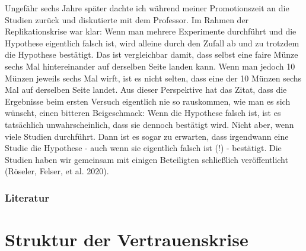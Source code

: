 \documentclass[
  letterpaper,
  DIV=11,
  numbers=noendperiod]{scrreprt}
\begin{document}
\begin{tcolorbox}
Ungefähr sechs Jahre später dachte ich während meiner Promotionszeit an
die Studien zurück und diskutierte mit dem Professor. Im Rahmen der
Replikationskrise war klar: Wenn man mehrere Experimente durchführt und
die Hypothese eigentlich falsch ist, wird alleine durch den Zufall ab
und zu trotzdem die Hypothese bestätigt. Das ist vergleichbar damit,
dass selbst eine faire Münze sechs Mal hintereinander auf derselben
Seite landen kann. Wenn man jedoch 10 Münzen jeweils sechs Mal wirft,
ist es nicht selten, dass eine der 10 Münzen sechs Mal auf derselben
Seite landet. Aus dieser Perspektive hat das Zitat, dass die Ergebnisse
beim ersten Versuch eigentlich nie so rauskommen, wie man es sich
wünscht, einen bitteren Beigeschmack: Wenn die Hypothese falsch ist, ist
es tatsächlich unwahrscheinlich, dass sie dennoch bestätigt wird. Nicht
aber, wenn viele Studien durchführt. Dann ist es sogar zu erwarten, dass
irgendwann eine Studie die Hypothese - auch wenn sie eigentlich falsch
ist (!) - bestätigt. Die Studien haben wir gemeinsam mit einigen
Beteiligten schließlich veröffentlicht (Röseler, Felser, et al. 2020).

\end{tcolorbox}

\subsection{Literatur}\label{literatur-6}

\chapter{Struktur der
Vertrauenskrise}\label{struktur-der-vertrauenskrise}
\end{document}
